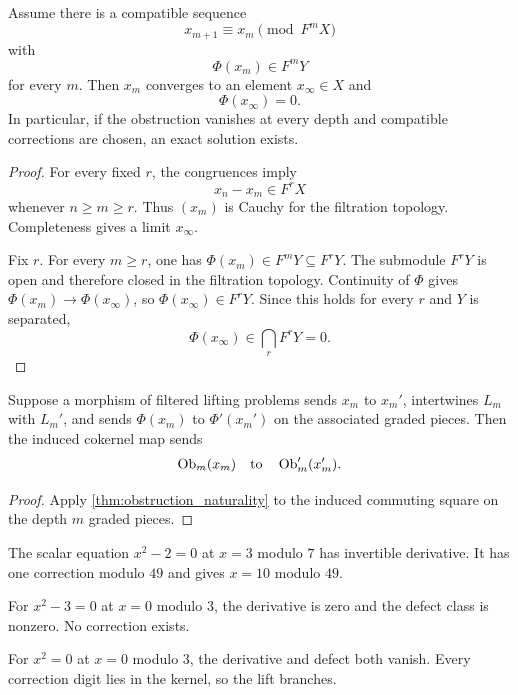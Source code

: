 \begin{theorem}\label{thm:complete_filtered_lifting}
Assume there is a compatible sequence
\[
x_{m+1}\equiv x_m\pmod{F^mX}
\]
with
\[
\Phi(x_m)\in F^mY
\]
for every $m$.  Then $x_m$ converges to an element $x_\infty\in X$ and
\[
\Phi(x_\infty)=0.
\]
In particular, if the obstruction vanishes at every depth and compatible corrections are chosen, an exact solution exists.
\end{theorem}

\begin{proof}
For every fixed $r$, the congruences imply
\[
x_n-x_m\in F^rX
\]
whenever $n\ge m\ge r$.  Thus $(x_m)$ is Cauchy for the filtration topology.  Completeness gives a limit $x_\infty$.

Fix $r$.  For every $m\ge r$, one has $\Phi(x_m)\in F^mY\subseteq F^rY$.  The submodule $F^rY$ is open and therefore closed in the filtration topology.  Continuity of $\Phi$ gives $\Phi(x_m)\to\Phi(x_\infty)$, so $\Phi(x_\infty)\in F^rY$.  Since this holds for every $r$ and $Y$ is separated,
\[
\Phi(x_\infty)\in\bigcap_rF^rY=0.
\]
\end{proof}

\begin{theorem}\label{thm:filtered_obstruction_naturality}
Suppose a morphism of filtered lifting problems sends $x_m$ to $x_m'$, intertwines $L_m$ with $L_m'$, and sends $\Phi(x_m)$ to $\Phi'(x_m')$ on the associated graded pieces.  Then the induced cokernel map sends
\[
\operatorname{Ob}_m(x_m)
\quad\text{to}\quad
\operatorname{Ob}_m'(x_m').
\]
\end{theorem}

\begin{proof}
Apply \cref{thm:obstruction_naturality} to the induced commuting square on the depth $m$ graded pieces.
\end{proof}

\begin{example}\label{ex:three_lifting_outcomes}
The scalar equation $x^2-2=0$ at $x=3$ modulo $7$ has invertible derivative.  It has one correction modulo $49$ and gives $x=10$ modulo $49$.

For $x^2-3=0$ at $x=0$ modulo $3$, the derivative is zero and the defect class is nonzero.  No correction exists.

For $x^2=0$ at $x=0$ modulo $3$, the derivative and defect both vanish.  Every correction digit lies in the kernel, so the lift branches.
\end{example}


